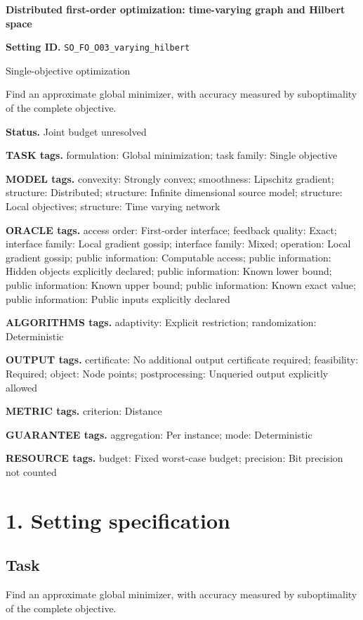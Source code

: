 \documentclass[10pt,a4paper]{article}
\begin{document}
\raggedright

{\LARGE\bfseries\sffamily\color{AtlasNavy} Distributed first-order optimization: time-varying graph and Hilbert space\par}\vspace{5pt}
\textbf{Setting ID.} \texttt{SO\_\allowbreak{}FO\_\allowbreak{}O03\_\allowbreak{}varying\_\allowbreak{}hilbert}

Single-objective optimization

Find an approximate global minimizer, with accuracy measured by suboptimality of the complete objective.

\textbf{Status.} Joint budget unresolved

\textbf{TASK tags.} formulation: Global minimization; task family: Single objective

\textbf{MODEL tags.} convexity: Strongly convex; smoothness: Lipschitz gradient; structure: Distributed; structure: Infinite dimensional source model; structure: Local objectives; structure: Time varying network

\textbf{ORACLE tags.} access order: First-order interface; feedback quality: Exact; interface family: Local gradient gossip; interface family: Mixed; operation: Local gradient gossip; public information: Computable access; public information: Hidden objects explicitly declared; public information: Known lower bound; public information: Known upper bound; public information: Known exact value; public information: Public inputs explicitly declared

\textbf{ALGORITHMS tags.} adaptivity: Explicit restriction; randomization: Deterministic

\textbf{OUTPUT tags.} certificate: No additional output certificate required; feasibility: Required; object: Node points; postprocessing: Unqueried output explicitly allowed

\textbf{METRIC tags.} criterion: Distance

\textbf{GUARANTEE tags.} aggregation: Per instance; mode: Deterministic

\textbf{RESOURCE tags.} budget: Fixed worst-case budget; precision: Bit precision not counted

\section{1. Setting specification}
\subsection{Task}
Find an approximate global minimizer, with accuracy measured by suboptimality of the complete objective.
\end{document}
